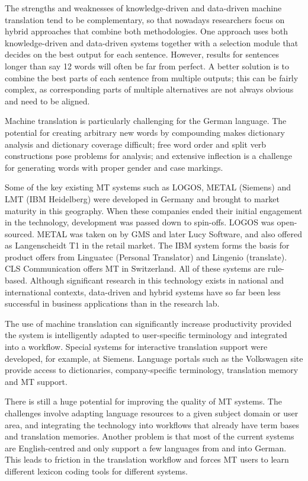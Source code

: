 \documentclass[]{../metanetpaper}
\begin{document}
\begin{Parallel}[c]{80mm}{80mm}
{    The strengths and weaknesses of knowledge-driven and data-driven machine translation tend to be complementary, so that nowadays researchers focus on hybrid approaches that combine both methodologies. One approach uses both knowledge-driven and data-driven systems together with a selection module that decides on the best output for each sentence. However, results for sentences longer than say 12 words will often be far from perfect. A better solution is to combine the best parts of each sentence from multiple outputs; this can be fairly complex, as corresponding parts of multiple alternatives are not always obvious and need to be aligned. 

    Machine translation is particularly challenging for the German language. The potential for creating arbitrary new words by compounding makes dictionary analysis and dictionary coverage difficult; free word order and split verb constructions pose problems for analysis; and extensive inflection is a challenge for generating words with proper gender and case markings. 

    Some of the key existing MT systems such as LOGOS, METAL (Siemens) and LMT (IBM Heidelberg) were developed in Germany and brought to market maturity in this geography. When these companies ended their initial engagement in the technology, development was passed down to spin-offs. LOGOS was open-sourced. METAL was taken on by GMS and later Lucy Software, and also offered as Langenscheidt T1 in the retail market. The IBM system forms the basis for product offers from Linguatec (Personal Translator) and Lingenio (translate). CLS Communication offers MT in Switzerland. All of these systems are rule-based. Although significant research in this technology exists in national and international contexts, data-driven and hybrid systems have so far been less successful in business applications than in the research lab. 

    The use of machine translation can significantly increase productivity provided the system is intelligently adapted to user-specific terminology and integrated into a workflow. Special systems for interactive translation support were developed, for example, at Siemens. Language portals such as the Volkswagen site provide access to dictionaries, company-specific terminology, translation memory and MT support. 

    There is still a huge potential for improving the quality of MT systems. The challenges involve adapting language resources to a given subject domain or user area, and integrating the technology into workflows that already have term bases and translation memories. Another problem is that most of the current systems are English-centred and only support a few languages from and into German. This leads to friction in the translation workflow and forces MT users to learn different lexicon coding tools for different systems.

}
\end{Parallel}
\end{document}
